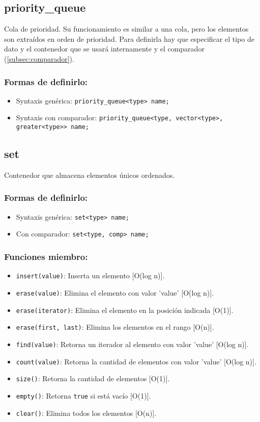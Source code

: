 \subsection{priority\_queue}
\label{subsec:std_priority_queue}
Cola de prioridad. Su funcionamiento es similar a una cola, pero los elementos son extraídos en orden de prioridad. Para definirla hay que especificar el tipo de dato y el contenedor que se usará internamente y el comparador (\ref{subsec:comparador}).

\subsubsection{Formas de definirlo:}
\begin{itemize}
  \item Syntaxis genérica: \texttt{priority\_queue<type> name;}
  \item Syntaxis con comparador: \texttt{priority\_queue<type, vector<type>, greater<type>> name;}
\end{itemize}

\subsection{set}
\label{subsec:std_set}
Contenedor que almacena elementos únicos ordenados. 

\subsubsection{Formas de definirlo:}
\begin{itemize}
  \item Syntaxis genérica: \texttt{set<type> name;}
  \item Con comparador: \texttt{set<type, comp> name;}
\end{itemize}

\subsubsection{Funciones miembro:}
\begin{itemize}
  \item \texttt{insert(value)}: Inserta un elemento [O(log n)]. 
  \item \texttt{erase(value)}: Elimina el elemento con valor 'value' [O(log n)].
  \item \texttt{erase(iterator)}: Elimina el elemento en la posición indicada [O(1)].
  \item \texttt{erase(first, last)}: Elimina los elementos en el rango [O(n)].
  \item \texttt{find(value)}: Retorna un iterador al elemento con valor 'value' [O(log n)]. 
  \item \texttt{count(value)}: Retorna la cantidad de elementos con valor 'value' [O(log n)]. 
  \item \texttt{size()}: Retorna la cantidad de elementos [O(1)]. 
  \item \texttt{empty()}: Retorna \texttt{true} si está vacío [O(1)]. 
  \item \texttt{clear()}: Elimina todos los elementos [O(n)]. 
\end{itemize}

